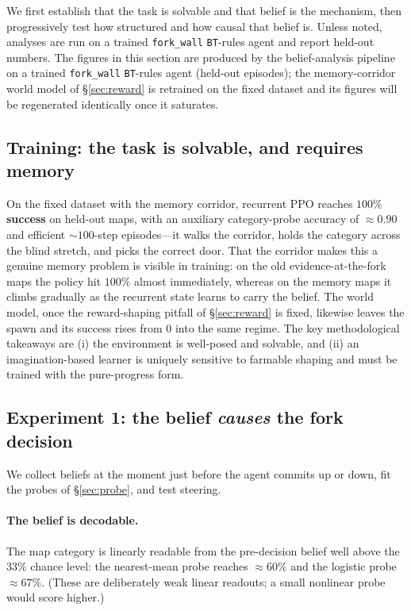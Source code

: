 \documentclass[11pt]{article}
\newcommand{\code}[1]{\texttt{\small #1}}
\begin{document}
We first establish that the task is solvable and that belief is the mechanism,
then progressively test how structured and how causal that belief is. Unless
noted, analyses are run on a trained \code{fork\_wall} \code{BT}-rules agent and
report held-out numbers.
The figures in this section are produced by the belief-analysis pipeline on a
trained \code{fork\_wall} \code{BT}-rules agent (held-out episodes); the memory-corridor
world model of \S\ref{sec:reward} is retrained on the fixed dataset and its
figures will be regenerated identically once it saturates.
\newcommand{\cogfig}{figures/cogniland}

\subsection{Training: the task is solvable, and requires memory}
On the fixed dataset with the memory corridor, recurrent PPO reaches
\textbf{$100\%$ success} on held-out maps, with an auxiliary category-probe
accuracy of $\approx 0.90$ and efficient $\sim\!100$-step episodes---it walks the
corridor, holds the category across the blind stretch, and picks the correct
door. That the corridor makes this a genuine memory problem is visible in
training: on the old evidence-at-the-fork maps the policy hit $100\%$ almost
immediately, whereas on the memory maps it climbs gradually as the recurrent
state learns to carry the belief. The world model, once the reward-shaping
pitfall of \S\ref{sec:reward} is fixed, likewise leaves the spawn and its success
rises from $0$ into the same regime. The key methodological takeaways are (i) the
environment is well-posed and solvable, and (ii) an imagination-based learner is
uniquely sensitive to farmable shaping and must be trained with the
pure-progress form.

\subsection{Experiment 1: the belief \emph{causes} the fork decision}
\label{sec:exp1}
We collect beliefs at the moment just before the agent commits up or down, fit
the probes of \S\ref{sec:probe}, and test steering.

\paragraph{The belief is decodable.} The map category is linearly readable from
the pre-decision belief well above the $33\%$ chance level: the nearest-mean
probe reaches $\approx 60\%$ and the logistic probe $\approx 67\%$. (These are
deliberately weak linear readouts; a small nonlinear probe would score higher.)
\end{document}

